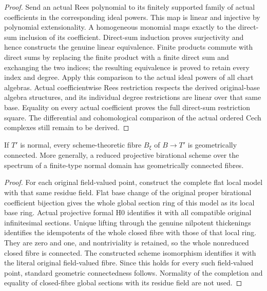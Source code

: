 \begin{proof}
Send an actual Rees polynomial to its finitely supported family of actual
coefficients in the corresponding ideal powers. This map is linear and injective
by polynomial extensionality. A homogeneous monomial maps exactly to the direct-sum
inclusion of its coefficient. Direct-sum induction proves surjectivity and hence
constructs the genuine linear equivalence. Finite products commute with direct sums
by replacing the finite product with a finite direct sum and exchanging the two
indices; the resulting equivalence is proved to retain every index and degree.
Apply this comparison to the actual ideal powers of all chart algebras. Actual
coefficientwise Rees restriction respects the derived original-base algebra
structures, and its individual degree restrictions are linear over that same base.
Equality on every actual coefficient proves the full direct-sum restriction square.
The differential and cohomological comparison of the actual ordered Cech complexes
still remain to be derived.
\end{proof}

\begin{theorem}\label{thm:fc-zariski}
\leanok
{}
If $T'$ is normal, every scheme-theoretic fibre $B_\xi$ of $B\to T'$ is geometrically connected.
More generally, a reduced projective birational scheme over the spectrum of a finite-type
normal domain has geometrically connected fibres.
\end{theorem}
\begin{proof}
For each original field-valued point, construct the complete flat local model with that
same residue field. Flat base change of the original proper birational coefficient
bijection gives the whole global section ring of this model as its local base ring.
Actual projective formal H0 identifies it with all compatible original infinitesimal
sections. Unique lifting through the genuine nilpotent thickenings identifies the
idempotents of the whole closed fibre with those of that local ring. They are zero and
one, and nontriviality is retained, so the whole nonreduced closed fibre is connected.
The constructed scheme isomorphism identifies it with the literal original field-valued
fibre. Since this holds for every such field-valued point, standard geometric connectedness
follows. Normality of the completion and equality of closed-fibre global sections with its
residue field are not used.
\end{proof}

